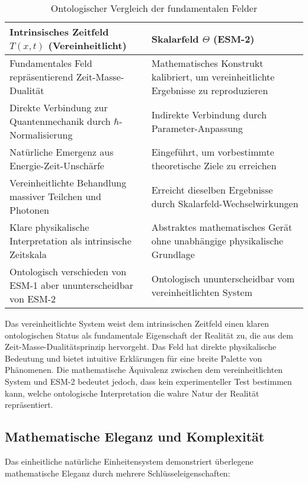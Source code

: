 \documentclass[12pt,a4paper]{article}
\newcommand{\Tfieldt}{T(x,t)}
\begin{document}
	\begin{table}[ht]
		\centering
		\caption{Ontologischer Vergleich der fundamentalen Felder}
		\label{tab:ontological_comparison}
		\begin{tabular}{p{}|p{}}
			\hline
			\textbf{Intrinsisches Zeitfeld $\Tfieldt$ (Vereinheitlicht)} & \textbf{Skalarfeld $\Theta$ (ESM-2)} \\
			\hline
			Fundamentales Feld repräsentierend Zeit-Masse-Dualität & Mathematisches Konstrukt kalibriert, um vereinheitlichte Ergebnisse zu reproduzieren \\
			\hline
			Direkte Verbindung zur Quantenmechanik durch $\hbar$-Normalisierung & Indirekte Verbindung durch Parameter-Anpassung \\
			\hline
			Natürliche Emergenz aus Energie-Zeit-Unschärfe & Eingeführt, um vorbestimmte theoretische Ziele zu erreichen \\
			\hline
			Vereinheitlichte Behandlung massiver Teilchen und Photonen & Erreicht dieselben Ergebnisse durch Skalarfeld-Wechselwirkungen \\
			\hline
			Klare physikalische Interpretation als intrinsische Zeitskala & Abstraktes mathematisches Gerät ohne unabhängige physikalische Grundlage \\
			\hline
			Ontologisch verschieden von ESM-1 aber ununterscheidbar von ESM-2 & Ontologisch ununterscheidbar vom vereinheitlichten System \\
			\hline
		\end{tabular}
	\end{table}
	
	Das vereinheitlichte System weist dem intrinsischen Zeitfeld einen klaren ontologischen Status als fundamentale Eigenschaft der Realität zu, die aus dem Zeit-Masse-Dualitätsprinzip hervorgeht. Das Feld hat direkte physikalische Bedeutung und bietet intuitive Erklärungen für eine breite Palette von Phänomenen. Die mathematische Äquivalenz zwischen dem vereinheitlichten System und ESM-2 bedeutet jedoch, dass kein experimenteller Test bestimmen kann, welche ontologische Interpretation die wahre Natur der Realität repräsentiert.
	
	\subsection{Mathematische Eleganz und Komplexität}
	\label{subsec:mathematical_elegance}
	
	Das einheitliche natürliche Einheitensystem demonstriert überlegene mathematische Eleganz durch mehrere Schlüsseleigenschaften:
	
\end{document}
